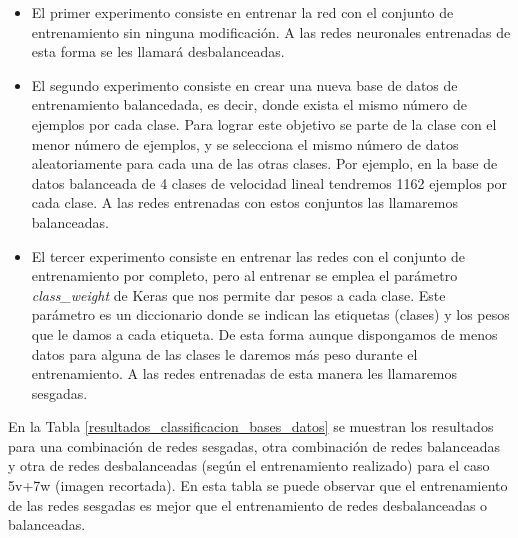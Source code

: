 \begin{itemize}
    \item El primer experimento consiste en entrenar la red con el conjunto de entrenamiento sin ninguna modificación. A las redes neuronales entrenadas de esta forma se les llamará desbalanceadas.
    
    \item El segundo experimento consiste en crear una nueva base de datos de entrenamiento balancedada, es decir, donde exista el mismo número de ejemplos por cada clase. Para lograr este objetivo se parte de la clase con el menor número de ejemplos, y se selecciona el mismo número de datos aleatoriamente para cada una de las otras clases. Por ejemplo, en la base de datos balanceada de 4 clases de velocidad lineal tendremos 1162 ejemplos por cada clase. A las redes entrenadas con estos conjuntos las llamaremos balanceadas.
    
    \item El tercer experimento consiste en entrenar las redes con el conjunto de entrenamiento por completo, pero al entrenar se emplea el parámetro \textit{class\_weight} de Keras que nos permite dar pesos a cada clase. Este parámetro es un diccionario donde se indican las etiquetas (clases) y los pesos que le damos a cada etiqueta. De esta forma aunque dispongamos de menos datos para alguna de las clases le daremos más peso durante el entrenamiento. A las redes entrenadas de esta manera les llamaremos sesgadas.
\end{itemize}


En la Tabla \ref{resultados_classificacion_bases_datos} se muestran los resultados para una combinación de redes sesgadas, otra combinación de redes balanceadas y otra de redes desbalanceadas (según el entrenamiento realizado) para el caso 5v+7w (imagen recortada). En esta tabla se puede observar que el entrenamiento de las redes sesgadas es mejor que el entrenamiento de redes desbalanceadas o balanceadas.\\

